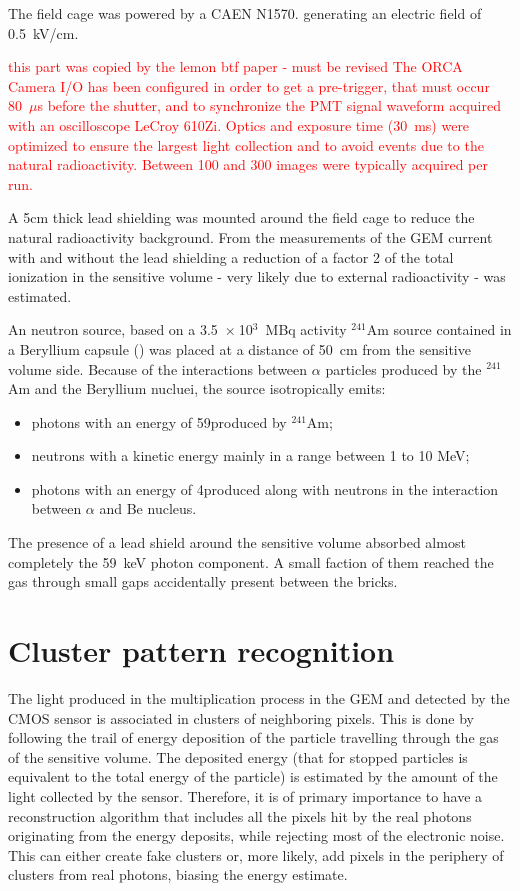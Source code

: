 \documentclass[12pt]{iopart}
\begin{document}
The field cage was powered by a CAEN N1570.\cite{CAENN1570} generating an electric field of 0.5~kV/cm. 

\textcolor{red}{this part was copied by the lemon btf paper - must be revised}
\textcolor{red}{The ORCA Camera I/O has been configured in order to get a pre-trigger, that must occur 80~$\mu$s before the shutter, and to synchronize the PMT signal waveform acquired with an oscilloscope LeCroy 610Zi. Optics and exposure time (30~ms) were optimized to ensure the largest light collection and to avoid events due to the natural radioactivity. Between 100 and 300 images were typically acquired per run. }

A  5cm thick lead shielding was mounted around the \lemon field cage to reduce the natural radioactivity background. From the measurements of the GEM current with and without the lead shielding a reduction of a factor 2  of the total ionization in the sensitive volume  - very likely due to external radioactivity -  was estimated.

 An neutron source, based on a 3.5~$\times~$10$^3$~MBq activity  $^{241}$Am source contained in a Beryllium capsule (\ambe) was placed at a distance of 50~cm from the sensitive volume side. 
 Because of the interactions between $\alpha$ particles produced by the $^{241}$Am and the Beryllium nucluei, the \ambe source isotropically emits:
 \begin{itemize}
     \item photons with an energy of 59\keV produced by $^{241}$Am;
     \item neutrons with a kinetic energy mainly in a range between 1 to 10 MeV;
     \item photons with an energy of 4\MeV produced along with neutrons in the interaction between $\alpha$ and Be nucleus.
 \end{itemize}
 
The presence of a lead shield around the sensitive volume absorbed almost completely the 59~keV photon component. A small faction of them reached the gas through small gaps accidentally present between the bricks.
 

\clearpage
 
\section{Cluster pattern recognition}
\label{sec:clustering}
The light produced in the multiplication process in the GEM and
detected by the CMOS sensor is associated in clusters of neighboring
pixels. This is done by following the trail of energy deposition of the particle travelling
through the gas of the sensitive volume. The deposited energy  (that for stopped particles is equivalent to the total energy of the particle)
 is estimated by the amount of the light
collected by the sensor.  Therefore, it is of primary importance to
have a reconstruction algorithm that  includes all  the pixels
hit by the real photons originating from the energy deposits, while
rejecting most of the electronic noise. This can either create fake
clusters or, more likely, add pixels in the periphery of clusters from
real photons, biasing the energy estimate.
\end{document}
